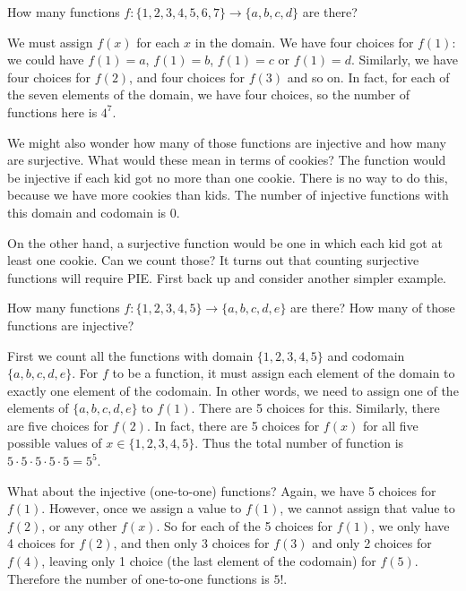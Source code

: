 \documentclass[12pt]{article}
\begin{document}
\begin{example}
 How many functions $f: \{1,2,3,4,5,6,7\} \to \{a,b,c,d\}$ are there?\footnotemark
 \begin{solution}
 	We must assign $f(x)$ for each $x$ in the domain.  We have four choices for $f(1)$: we could have $f(1) = a$, $f(1) = b$, $f(1) = c$ or $f(1) = d$.  Similarly, we have four choices for $f(2)$, and four choices for $f(3)$ and so on.  In fact, for each of the seven elements of the domain, we have four choices, so the number of functions here is $4^7$.
 \end{solution}
\end{example}

We might also wonder how many of those functions are injective and how many are surjective.  What would these mean in terms of cookies?  The function would be injective if each kid got no more than one cookie.  There is no way to do this, because we have more cookies than kids.  The number of injective functions with this domain and codomain is 0.

On the other hand, a surjective function would be one in which each kid got at least one cookie.  Can we count those? It turns out that counting surjective functions will require PIE.  First back up and consider another simpler example.

\begin{example}
  How many functions $f: \{1,2,3,4,5\} \to \{a,b,c,d,e\}$ are there?  How many of those functions are injective?
  \begin{solution}
    First we count all the functions with domain $\{1,2,3,4,5\}$ and codomain $\{a,b,c,d,e\}$.  For $f$ to be a function, it must assign each element of the domain to exactly one element of the codomain.  In other words, we need to assign one of the elements of $\{a,b,c,d,e\}$ to $f(1)$.  There are 5 choices for this.  Similarly, there are five choices for $f(2)$.  In fact, there are 5 choices for $f(x)$ for all five possible values of $x \in \{1,2,3,4,5\}$.  Thus the total number of function is $5 \cdot 5 \cdot 5 \cdot 5 \cdot 5 = 5^5$.

    What about the injective (one-to-one) functions?  Again, we have 5 choices for $f(1)$.  However, once we assign a value to $f(1)$, we cannot assign that value to $f(2)$, or any other $f(x)$.  So for each of the 5 choices for $f(1)$, we only have 4 choices for $f(2)$, and then only 3 choices for $f(3)$ and only 2 choices for $f(4)$, leaving only 1 choice (the last element of the codomain) for $f(5)$.  Therefore the number of one-to-one functions is $5!$.
  \end{solution}

\end{example}
\end{document}
